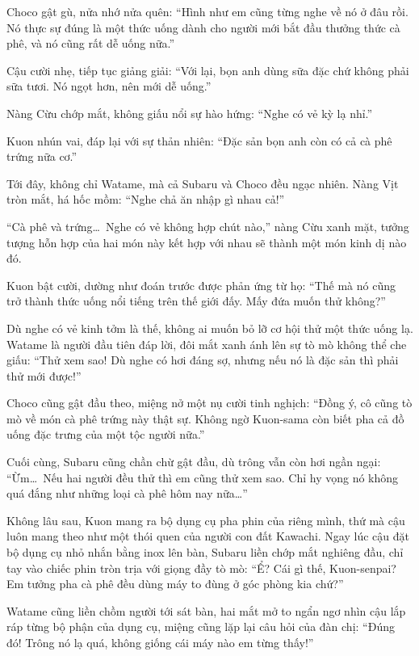 \documentclass[../main.tex]{subfiles}
\begin{document}
Choco gật gù, nửa nhớ nửa quên: ``Hình như em cũng từng nghe về nó ở đâu rồi. Nó thực sự đúng là một thức uống dành cho người mới bắt đầu thưởng thức cà phê, và nó cũng rất dễ uống nữa.''

Cậu cười nhẹ, tiếp tục giảng giải: ``Với lại, bọn anh dùng sữa đặc chứ không phải sữa tươi. Nó ngọt hơn, nên mới dễ uống.''

Nàng Cừu chớp mắt, không giấu nổi sự hào hứng: ``Nghe có vẻ kỳ lạ nhỉ.''

Kuon nhún vai, đáp lại với sự thản nhiên: ``Đặc sản bọn anh còn có cả cà phê trứng nữa cơ.''

Tới đây, không chỉ Watame, mà cả Subaru và Choco đều ngạc nhiên. Nàng Vịt tròn mắt, há hốc mồm: ``Nghe chả ăn nhập gì nhau cả!''

``Cà phê và trứng\dots\ Nghe có vẻ không hợp chút nào,'' nàng Cừu xanh mặt, tưởng tượng hỗn hợp của hai món này kết hợp với nhau sẽ thành một món kinh dị nào đó.

Kuon bật cười, dường như đoán trước được phản ứng từ họ: ``Thế mà nó cũng trở thành thức uống nổi tiếng trên thế giới đấy. Mấy đứa muốn thử không?''

Dù nghe có vẻ kinh tởm là thế, không ai muốn bỏ lỡ cơ hội thử một thức uống lạ. Watame là người đầu tiên đáp lời, đôi mắt xanh ánh lên sự tò mò không thể che giấu: ``Thử xem sao! Dù nghe có hơi đáng sợ, nhưng nếu nó là đặc sản thì phải thử mới được!''

Choco cũng gật đầu theo, miệng nở một nụ cười tinh nghịch: ``Đồng ý, cô cũng tò mò về món cà phê trứng này thật sự. Không ngờ Kuon-sama còn biết pha cả đồ uống đặc trưng của một tộc người nữa.''

Cuối cùng, Subaru cũng chần chừ gật đầu, dù trông vẫn còn hơi ngần ngại: ``Ừm\dots\ Nếu hai người đều thử thì em cũng thử xem sao. Chỉ hy vọng nó không quá đắng như những loại cà phê hôm nay nữa\dots''

\ct

Không lâu sau, Kuon mang ra bộ dụng cụ pha phin của riêng mình, thứ mà cậu luôn mang theo như một thói quen của người con đất Kawachi. Ngay lúc cậu đặt bộ dụng cụ nhỏ nhắn bằng inox lên bàn, Subaru liền chớp mắt nghiêng đầu, chỉ tay vào chiếc phin tròn trịa với giọng đầy tò mò: ``Ể? Cái gì thế, Kuon-senpai? Em tưởng pha cà phê đều dùng máy to đùng ở góc phòng kia chứ?''

Watame cũng liền chồm người tới sát bàn, hai mắt mở to ngẩn ngơ nhìn cậu lắp ráp từng bộ phận của dụng cụ, miệng cũng lặp lại câu hỏi của đàn chị: ``Đúng đó! Trông nó lạ quá, không giống cái máy nào em từng thấy!''
\end{document}
